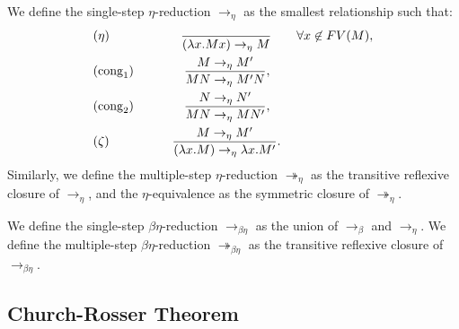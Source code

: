 \begin{definition}
We define the single-step $\eta$-reduction $\to_\eta$ as the smallest relationship such that: 
  \begin{align*}
    &(\eta) \qquad\qquad \ \ \ \  \ {\ \over(\lambda x.Mx) \to_\eta M} \qquad \forall x \not  \in FV(M),\\
    &(\operatorname{cong}_1)\qquad\qquad{ M \to_\eta M' \over MN \to_\eta M'N },\\
    &(\operatorname{cong}_2)\qquad\qquad{ N \to_\eta N' \over MN \to_\eta MN' },\\
    &(\zeta) \qquad\qquad \ \  \ {M\to_\eta M' \over(\lambda x.M) \to_\eta \lambda x.M'}.\\
  \end{align*}
  Similarly, we define the multiple-step $\eta$-reduction $\twoheadrightarrow_\eta$ as the transitive reflexive closure of $\to_\eta$, and the $\eta$-equivalence as the symmetric closure of $\twoheadrightarrow_\eta$.
\end{definition}
\begin{definition}
  We define the single-step $\beta\eta$-reduction $\to_{\beta\eta}$ as the union of $\to_\beta$ and $\to_\eta$.  We define the multiple-step $\beta\eta$-reduction $\twoheadrightarrow_{\beta\eta}$ as the transitive reflexive closure of $\to_{\beta\eta}$.
\end{definition}




\subsection{Church-Rosser Theorem}

